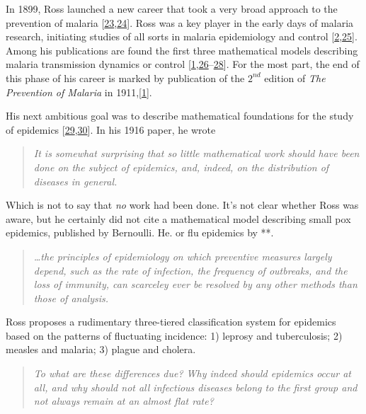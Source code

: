 \documentclass[
]{book}
\begin{document}
In 1899, Ross launched a new career that took a very broad approach to the prevention of malaria {[}\protect\hyperlink{ref-RossR1899ExterminationMalaria}{23},\protect\hyperlink{ref-RossR1899InauguralLecture}{24}{]}.
Ross was a key player in the early days of malaria research, initiating studies of all sorts in malaria epidemiology and control {[}\protect\hyperlink{ref-SmithDL2012_RossMacdonald}{2},\protect\hyperlink{ref-BockarieMJ1999ItAll}{25}{]}.
Among his publications are found the first three mathematical models describing malaria transmission dynamics or control {[}\protect\hyperlink{ref-RossR1911Book}{1},\protect\hyperlink{ref-RossR1905LogicalBasis}{26}--\protect\hyperlink{ref-RossR1911Nature}{28}{]}.
For the most part, the end of this phase of his career is marked by publication of the \(2^{nd}\) edition of \emph{The Prevention of Malaria} in 1911,{[}\protect\hyperlink{ref-RossR1911Book}{1}{]}.

His next ambitious goal was to describe mathematical foundations for the study of epidemics {[}\protect\hyperlink{ref-RossR1915AprioriPathometry}{29},\protect\hyperlink{ref-RossR1916ApplicationTheory}{30}{]}.
In his 1916 paper, he wrote

\begin{quote}
\emph{It is somewhat surprising that so little mathematical work should have been done on the subject of epidemics, and, indeed, on the distribution of diseases in general.}
\end{quote}

Which is not to say that \emph{no} work had been done. It's not clear whether Ross was aware, but he certainly did not cite a mathematical model describing small pox epidemics, published by Bernoulli. He. or flu epidemics by **.

\begin{quote}
\emph{\ldots the principles of epidemiology on which preventive measures largely depend, such as the rate of infection, the frequency of outbreaks, and the loss of immunity, can scarceley ever be resolved by any other methods than those of analysis.}
\end{quote}

Ross proposes a rudimentary three-tiered classification system for epidemics based on the patterns of fluctuating incidence: 1) leprosy and tuberculosis; 2) measles and malaria; 3) plague and cholera.

\begin{quote}
\emph{To what are these differences due? Why indeed should epidemics occur at all, and why should not all infectious diseases belong to the first group and not always remain at an almost flat rate?}
\end{quote}
\end{document}
